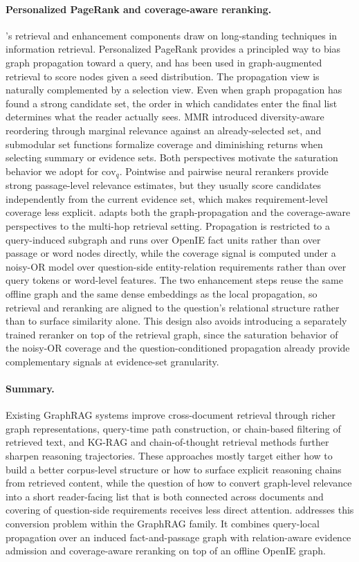 \paragraph{Personalized PageRank and coverage-aware reranking.}
\methodname{}'s retrieval and enhancement components draw on
long-standing techniques in information retrieval. Personalized
PageRank \citep{haveliwala2002topic,jeh2003scaling} provides a
principled way to bias graph propagation toward a query, and has been
used in graph-augmented retrieval to score nodes given a seed
distribution. The propagation view is naturally complemented by a
selection view. Even when graph propagation has found a strong
candidate set, the order in which candidates enter the final list
determines what the reader actually sees. MMR \citep{carbonell1998mmr}
introduced diversity-aware reordering through marginal relevance
against an already-selected set, and submodular set functions
\citep{lin2011submodular} formalize coverage and diminishing returns
when selecting summary or evidence sets. Both perspectives motivate the
saturation behavior we adopt for $\mathrm{cov}_q$. Pointwise and
pairwise neural rerankers provide strong passage-level relevance
estimates, but they usually score candidates independently from the
current evidence set, which makes requirement-level coverage less
explicit. \methodname{} adapts both the graph-propagation and the
coverage-aware perspectives to the multi-hop retrieval setting.
Propagation is restricted to a query-induced subgraph and runs over
OpenIE fact units rather than over passage or word nodes directly,
while the coverage signal is computed under a noisy-OR model over
question-side entity-relation requirements rather than over query
tokens or word-level features. The two enhancement steps reuse the
same offline graph and the same dense embeddings as the local
propagation, so retrieval and reranking are aligned to the question's
relational structure rather than to surface similarity alone. This
design also avoids introducing a separately trained reranker on top of
the retrieval graph, since the saturation behavior of the noisy-OR
coverage and the question-conditioned propagation already provide
complementary signals at evidence-set granularity.

\paragraph{Summary.}
Existing GraphRAG systems improve cross-document retrieval through
richer graph representations, query-time path construction, or
chain-based filtering of retrieved text, and KG-RAG and
chain-of-thought retrieval methods further sharpen reasoning
trajectories. These approaches mostly target either how to build a
better corpus-level structure or how to surface explicit reasoning
chains from retrieved content, while the question of how to convert
graph-level relevance into a short reader-facing list that is both
connected across documents and covering of question-side requirements
receives less direct attention. \methodname{} addresses this
conversion problem within the GraphRAG family. It combines query-local
propagation over an induced fact-and-passage graph with
relation-aware evidence admission and coverage-aware reranking on top
of an offline OpenIE graph.
